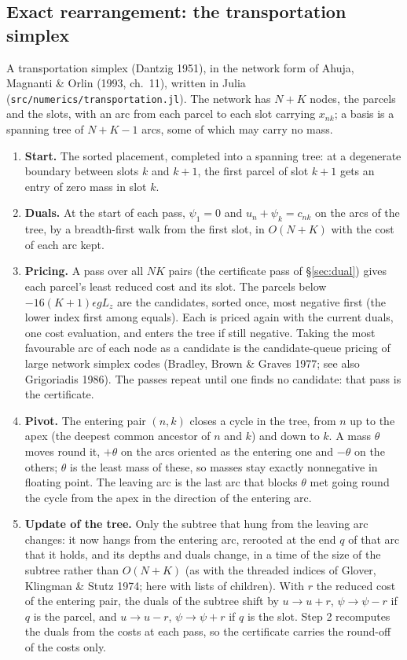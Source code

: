 \documentclass[11pt,a4paper]{article}
\newcommand{\code}[1]{\texttt{#1}}
\begin{document}
\subsection{Exact rearrangement: the transportation simplex}\label{sec:exact}
A transportation simplex (Dantzig 1951), in the network form of Ahuja, Magnanti \& Orlin (1993, ch.~11), written in Julia
(\code{src/numerics/transportation.jl}). The network has $N+K$ nodes, the parcels and the slots, with an arc from each parcel
to each slot carrying $x_{nk}$; a basis is a spanning tree of $N+K-1$ arcs, some of which may carry no mass.
\begin{enumerate}
  \item \textbf{Start.} The sorted placement, completed into a spanning tree: at a degenerate boundary between slots $k$ and
        $k+1$, the first parcel of slot $k+1$ gets an entry of zero mass in slot $k$.
  \item \textbf{Duals.} At the start of each pass, $\psi_1=0$ and $u_n+\psi_k=c_{nk}$ on the arcs of the tree, by a
        breadth-first walk from the first slot, in $O(N+K)$ with the cost of each arc kept.
  \item \textbf{Pricing.} A pass over all $NK$ pairs (the certificate pass of \S\ref{sec:dual}) gives each parcel's least
        reduced cost and its slot. The parcels below $-16(K+1)\epsilon gL_z$ are the candidates, sorted once, most negative first
        (the lower index first among equals). Each is priced again with the current duals, one cost evaluation, and enters
        the tree if still negative. Taking the most favourable arc of each node as a candidate is the candidate-queue pricing
        of large network simplex codes (Bradley, Brown \& Graves 1977; see also Grigoriadis 1986). The passes repeat until
        one finds no candidate: that pass is the certificate.
  \item \textbf{Pivot.} The entering pair $(n,k)$ closes a cycle in the tree, from $n$ up to the apex (the deepest common
        ancestor of $n$ and $k$) and down to $k$. A mass $\theta$ moves round it, $+\theta$ on the arcs oriented as the entering
        one and $-\theta$ on the others; $\theta$ is the least mass of these, so masses stay exactly nonnegative in floating
        point. The leaving arc is the last arc that blocks $\theta$ met going round the cycle from the apex in the direction
        of the entering arc.
  \item \textbf{Update of the tree.} Only the subtree that hung from the leaving arc changes: it now hangs from the entering
        arc, rerooted at the end $q$ of that arc that it holds, and its depths and duals change, in a time of the size of
        the subtree rather than $O(N+K)$ (as with the threaded indices of Glover, Klingman \& Stutz 1974; here with lists of
        children). With $r$ the reduced cost of the entering pair, the duals of the subtree shift by $u\to u+r$,
        $\psi\to\psi-r$ if $q$ is the parcel, and $u\to u-r$, $\psi\to\psi+r$ if $q$ is the slot. Step 2 recomputes the duals
        from the costs at each pass, so the certificate carries the round-off of the costs only.
\end{enumerate}
\end{document}
